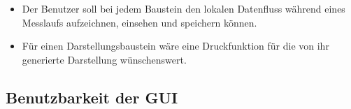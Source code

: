 \documentclass[parskip=full]{scrartcl}
\begin{document}
\begin{itemize}
	\item 
	\begin{WunschKrit} 			
		Der Benutzer soll bei jedem Baustein den lokalen Datenfluss während eines Messlaufs aufzeichnen, einsehen und speichern können. 
	\end{WunschKrit}
		
	\item
	\begin{WunschKrit} 
		Für einen Darstellungsbaustein wäre eine Druckfunktion für die von ihr generierte Darstellung wünschenswert. 
	\end{WunschKrit}
	
	
\end{itemize}



\subsection {Benutzbarkeit der GUI}
\end{document}
